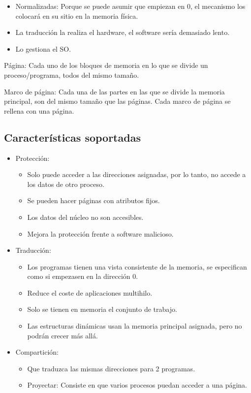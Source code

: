 \documentclass[12pt, twoside, openright]{report} %
\begin{document}
\begin{itemize}
	\item Normalizadas: Porque se puede asumir que empiezan en 0, el mecanismo
	      los colocará en su sitio en la memoria física.

	\item La traducción la realiza el hardware, el software sería demasiado
	      lento.
	\item Lo gestiona el SO.
\end{itemize}

Página: Cada uno de los bloques de memoria en lo que se divide un
proceso/programa, todos del mismo tamaño.

Marco de página: Cada una de las partes en las que se divide la
memoria principal, son del mismo tamaño que las páginas. Cada marco
de página se rellena con una página.

\subsection{Características soportadas}

\begin{itemize}

	\item Protección:

	      \begin{itemize}

		      \item Solo puede acceder a las direcciones asignadas, por lo tanto, no
		            accede a los datos de otro proceso.
		      \item Se pueden hacer páginas con atributos fijos.
		      \item Los datos del núcleo no son accesibles.
		      \item Mejora la protección frente a software malicioso.
	      \end{itemize}
	\item Traducción:

	      \begin{itemize}

		      \item Los programas tienen una vista consistente de la memoria, se
		            especifican como si empezasen en la dirección 0.
		      \item Reduce el coste de aplicaciones multihilo.
		      \item Solo se tienen en memoria el conjunto de trabajo.
		      \item Las estructuras dinámicas usan la memoria principal asignada,
		            pero no podrán crecer más allá.
	      \end{itemize}
	\item Compartición:

	      \begin{itemize}

		      \item Que traduzca las mismas direcciones para 2 programas.
		      \item Proyectar: Consiste en que varios procesos puedan acceder a una
		            página.
	      \end{itemize}
\end{itemize}
\end{document}
